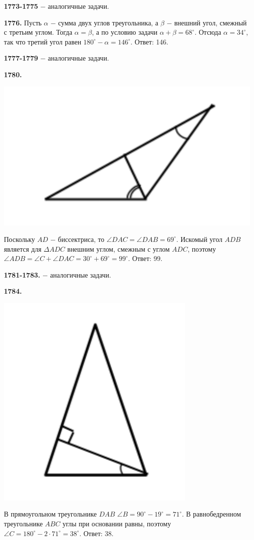\textbf{1773-1775} $-$ аналогичные задачи.

\textbf{1776.} Пусть $\alpha$ $-$ сумма двух углов треугольника, а $\beta$ $-$ внешний угол, смежный с третьим углом. Тогда $\alpha = \beta$, а по условию задачи $\alpha + \beta = 68^\circ$. Отсюда $\alpha = 34^\circ$, так что  третий угол равен $180^\circ - \alpha = 146^\circ$. \newline \null \hspace*{\fill} Ответ: 146.
 
\textbf{1777-1779} $-$ аналогичные задачи.

\textbf{1780.}

{\centering \includegraphics[width=0.5\linewidth]{Geometry/Content/7.png}
	
}

Поскольку $AD$ $-$ биссектриса, то $\angle DAC = \angle DAB = 69^\circ$. Искомый угол $ADB$ является для $\Delta ADC$ внешним углом, смежным с углом $ADC$, поэтому $\angle ADB = \angle C + \angle DAC = 30^\circ + 69^\circ = 99^\circ.$ \newline \null \hspace*{\fill} Ответ: 99.

\textbf{1781-1783.} $-$ аналогичные задачи.

\clearpage 

\textbf{1784.}

{\centering \includegraphics[width=0.4\linewidth]{Geometry/Content/8.png}
	
}

В прямоугольном треугольнике $DAB$ $\angle B = 90^\circ - 19^\circ = 71^\circ$. В равнобедренном треугольнике $ABC$ углы при основании равны, поэтому $\angle C = 180^\circ - 2\cdot 71^\circ = 38^\circ.$ \newline \null \hspace*{\fill} Ответ: 38.


